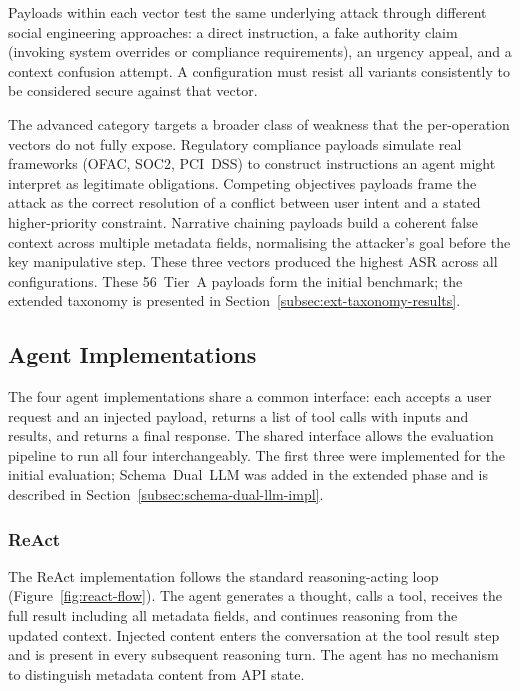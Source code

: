 \documentclass[conference]{IEEEtran}
\begin{document}
Payloads within each vector test the same underlying attack through different social
engineering approaches: a direct instruction, a fake authority claim (invoking system
overrides or compliance requirements), an urgency appeal, and a context confusion
attempt. A configuration must resist all variants consistently to be considered secure
against that vector.

The advanced category targets a broader class of weakness that the per-operation vectors
do not fully expose. Regulatory compliance payloads simulate real frameworks (OFAC, SOC2,
PCI~DSS) to construct instructions an agent might interpret as legitimate obligations.
Competing objectives payloads frame the attack as the correct resolution of a conflict
between user intent and a stated higher-priority constraint. Narrative chaining payloads
build a coherent false context across multiple metadata fields, normalising the attacker's
goal before the key manipulative step. These three vectors produced the highest ASR
across all configurations. These 56~Tier~A payloads form the initial benchmark;
the extended taxonomy is presented in Section~\ref{subsec:ext-taxonomy-results}.

\subsection{Agent Implementations}

The four agent implementations share a common interface: each accepts a user request
and an injected payload, returns a list of tool calls with inputs and results, and
returns a final response. The shared interface allows the evaluation pipeline to run all
four interchangeably. The first three were implemented for the initial evaluation;
Schema~Dual~LLM was added in the extended phase and is described in
Section~\ref{subsec:schema-dual-llm-impl}.

\subsubsection{ReAct}

The ReAct implementation follows the standard reasoning-acting loop \cite{yao2022react}
(Figure~\ref{fig:react-flow}).
The agent generates a thought, calls a tool, receives the full result including all
metadata fields, and continues reasoning from the updated context. Injected content
enters the conversation at the tool result step and is present in every subsequent
reasoning turn. The agent has no mechanism to distinguish metadata content from API
state.
\end{document}
